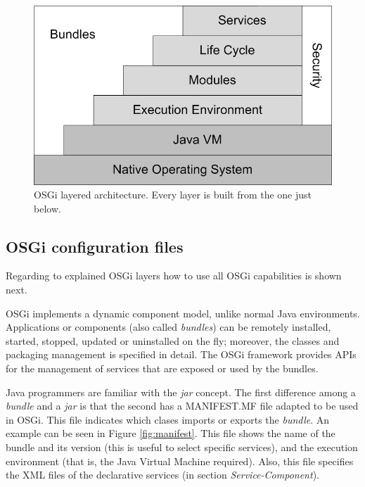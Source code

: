 \documentclass{sig-alternate}
\begin{document}
\begin{figure}[t] 
\begin{center} 
\includegraphics[scale=0.8]{images/osgi-oficial.eps} 
\end{center} 
\caption{OSGi layered architecture. Every layer is built from the one just below.} 
\label{fig:osgi-original} 
\end{figure}



\subsection{OSGi configuration files}
Regarding to explained OSGi layers how to use all OSGi capabilities is shown next. 

OSGi implements a dynamic component model, unlike normal Java
environments. Applications or components (also called
\emph{bundles}) can be remotely installed, started, stopped, updated
or uninstalled on the fly; moreover, the classes and
packaging management is specified in detail. The OSGi framework provides
APIs for the management of services that are exposed or used by the
bundles.

Java programmers are familiar with the {\em jar} concept. The first difference among a {\em bundle} and a {\em jar} is that the second has a MANIFEST.MF file adapted to be used in OSGi. This file indicates which clases imports or exports the {\em bundle}. An example can be seen in Figure \ref{fig:manifest}. This file shows the name of the bundle and its version (this is useful to select specific services), and the execution environment (that is, the Java Virtual Machine required). Also, this file specifies the XML files of the declarative services (in section {\em Service-Component}).
\end{document}
